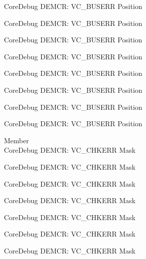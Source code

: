 \begin{DoxyRefList}
\label{deprecated__deprecated000510}%
%
Core\+Debug DEMCR\+: VC\+\_\+\+BUSERR Position 

\label{deprecated__deprecated000612}%
%
Core\+Debug DEMCR\+: VC\+\_\+\+BUSERR Position 

\label{deprecated__deprecated000718}%
%
Core\+Debug DEMCR\+: VC\+\_\+\+BUSERR Position 

\label{deprecated__deprecated000862}%
%
Core\+Debug DEMCR\+: VC\+\_\+\+BUSERR Position 

\label{deprecated__deprecated001004}%
%
Core\+Debug DEMCR\+: VC\+\_\+\+BUSERR Position 

\label{deprecated__deprecated001080}%
%
Core\+Debug DEMCR\+: VC\+\_\+\+BUSERR Position 

\label{deprecated__deprecated001169}%
%
Core\+Debug DEMCR\+: VC\+\_\+\+BUSERR Position 

\label{deprecated__deprecated001271}%
%
Core\+Debug DEMCR\+: VC\+\_\+\+BUSERR Position  
\item[Member \doxylink{group___c_m_s_i_s___core_debug_ga2f98b461d19746ab2febfddebb73da6f}{Core\+Debug\+\_\+\+DEMCR\+\_\+\+VC\+\_\+\+CHKERR\+\_\+\+Msk} ]\hfill \\
\label{deprecated__deprecated000064}%
%
Core\+Debug DEMCR\+: VC\+\_\+\+CHKERR Mask 

\label{deprecated__deprecated000208}%
%
Core\+Debug DEMCR\+: VC\+\_\+\+CHKERR Mask 

\label{deprecated__deprecated000350}%
%
Core\+Debug DEMCR\+: VC\+\_\+\+CHKERR Mask 

\label{deprecated__deprecated000426}%
%
Core\+Debug DEMCR\+: VC\+\_\+\+CHKERR Mask 

\label{deprecated__deprecated000515}%
%
Core\+Debug DEMCR\+: VC\+\_\+\+CHKERR Mask 

\label{deprecated__deprecated000617}%
%
Core\+Debug DEMCR\+: VC\+\_\+\+CHKERR Mask 

\label{deprecated__deprecated000723}%
%
Core\+Debug DEMCR\+: VC\+\_\+\+CHKERR Mask 


\end{DoxyRefList}
